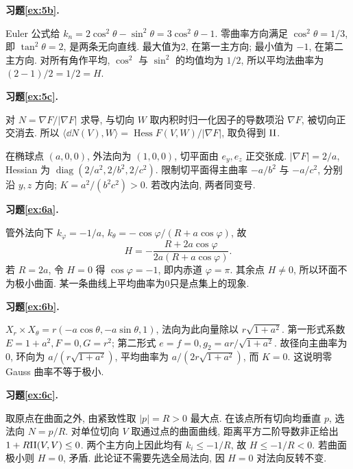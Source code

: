 \noindent\textbf{习题\ref{ex:5b}.}
\begin{solution}
Euler 公式给 $k_n=2\cos^2\theta-\sin^2\theta=3\cos^2\theta-1$. 零曲率方向满足 $\cos^2\theta=1/3$, 即 $\tan^2\theta=2$, 是两条无向直线. 最大值为2, 在第一主方向; 最小值为 $-1$, 在第二主方向. 对所有角作平均, $\cos^2$ 与 $\sin^2$ 的均值均为 $1/2$, 所以平均法曲率为 $(2-1)/2=1/2=H$.
\end{solution}
\par{}
\noindent\textbf{习题\ref{ex:5c}.}
\begin{solution}
对 $N=\nabla F/|\nabla F|$ 求导, 与切向 $W$ 取内积时归一化因子的导数项沿 $\nabla F$, 被切向正交消去. 所以 $\langle\dd N(V),W\rangle=\operatorname{Hess}F(V,W)/|\nabla F|$, 取负得到 $\mathrm{II}$.

在椭球点 $(a,0,0)$, 外法向为 $(1,0,0)$, 切平面由 $e_y,e_z$ 正交张成. $|\nabla F|=2/a$, Hessian 为 $\operatorname{diag}(2/a^2,2/b^2,2/c^2)$. 限制切平面得主曲率 $-a/b^2$ 与 $-a/c^2$, 分别沿 $y,z$ 方向; $K=a^2/(b^2c^2)>0$. 若改内法向, 两者同变号.
\end{solution}
\par{}
\par{}
\noindent\textbf{习题\ref{ex:6a}.}
\begin{solution}
管外法向下 $k_\varphi=-1/a$, $k_\theta=-\cos\varphi/(R+a\cos\varphi)$, 故
\[
 H=-\frac{R+2a\cos\varphi}{2a(R+a\cos\varphi)}.
\]
若 $R=2a$, 令 $H=0$ 得 $\cos\varphi=-1$, 即内赤道 $\varphi=\pi$. 其余点 $H\ne0$, 所以环面不为极小曲面. 某一条曲线上平均曲率为0只是点集上的现象.
\end{solution}
\par{}
\noindent\textbf{习题\ref{ex:6b}.}
\begin{solution}
$X_r\times X_\theta=r(-a\cos\theta,-a\sin\theta,1)$, 法向为此向量除以 $r\sqrt{1+a^2}$. 第一形式系数 $E=1+a^2,F=0,G=r^2$; 第二形式 $e=f=0,g_2=ar/\sqrt{1+a^2}$. 故径向主曲率为0, 环向为 $a/(r\sqrt{1+a^2})$, 平均曲率为 $a/(2r\sqrt{1+a^2})$, 而 $K=0$. 这说明零 Gauss 曲率不等于极小.
\end{solution}
\par{}
\noindent\textbf{习题\ref{ex:6c}.}
\begin{solution}
取原点在曲面之外, 由紧致性取 $|p|=R>0$ 最大点. 在该点所有切向均垂直 $p$, 选法向 $N=p/R$. 对单位切向 $V$ 取通过点的曲面曲线, 距离平方二阶导数非正给出 $1+R\mathrm{II}(V,V)\le0$. 两个主方向上因此均有 $k_i\le-1/R$, 故 $H\le-1/R<0$. 若曲面极小则 $H=0$, 矛盾. 此论证不需要先选全局法向, 因 $H=0$ 对法向反转不变.
\end{solution}
